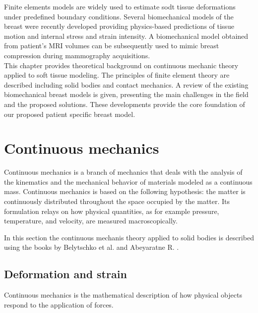

Finite elements models are widely used to estimate sodt tissue deformations under predefined boundary conditions. Several biomechanical models of the breast were recently developed providing physics-based predictions of tissue motion and internal stress and strain intensity. A biomechanical model obtained from patient's MRI volumes can be subsequently used to mimic breast compression during mammography acquisitions.\\


This chapter provides theoretical background on continuous mechanic theory applied to soft tissue modeling. The principles of finite element theory are described including solid bodies and contact mechanics. A review of the existing biomechanical breast models is given, presenting the main challenges in the field and the proposed solutions. These developments provide the core foundation of our proposed  patient specific breast model. 
      
\clearpage
\section{Continuous mechanics}
\label{section:continuousmechanics}
Continuous mechanics is a branch of mechanics that deals with the analysis of the kinematics and the mechanical behavior of materials modeled as a continuous mass. Continuous mechanics is based on the following hypothesis: the matter is continuously distributed throughout the space occupied by the matter. Its formulation relays on how physical quantities, as for example pressure, temperature, and velocity, are measured macroscopically.

In this section the continuous mechanis theory applied to solid bodies is described using the books by Belytschko et al. \citep{belytschko_nonlinear_2013} and Abeyaratne R. \citep{abeyaratne_continuum_2012}.
\subsection{Deformation and strain}\label{subsection:defromationandstrain}
Continuous mechanics is the mathematical description of how physical objects respond to the application of forces.

